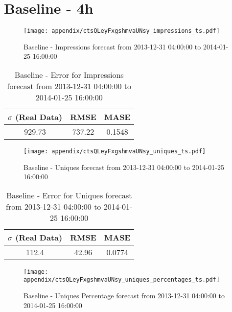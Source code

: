 \section{Baseline - 4h}
\begin{figure}[H] \begin{center} \leavevmode
\texttt{[image: appendix/ctsQLeyFxgshmvaUNsy\_impressions\_ts.pdf]} \caption[]{
Baseline - Impressions forecast from 2013-12-31 04:00:00 to 2014-01-25 16:00:00} \label{fig:appendix/ctsQLeyFxgshmvaUNsy_impressions_ts.pdf} \end{center}
\end{figure}

\begin{table}[H]
\centering
\footnotesize
\begin{tabular}{ccc}
$\sigma$ (Real Data) & RMSE & MASE   \\ \hline
929.73 & 737.22 & 0.1548 \\
\end{tabular}

\vspace{0.5cm}

\caption[]{
Baseline - Error for Impressions forecast from 2013-12-31 04:00:00 to 2014-01-25 16:00:00}
\end{table}

\begin{figure}[H] \begin{center} \leavevmode
\texttt{[image: appendix/ctsQLeyFxgshmvaUNsy\_uniques\_ts.pdf]} \caption[]{
Baseline - Uniques forecast from 2013-12-31 04:00:00 to 2014-01-25 16:00:00} \label{fig:appendix/ctsQLeyFxgshmvaUNsy_uniques_ts.pdf} \end{center}
\end{figure}

\begin{table}[H]
\centering
\footnotesize
\begin{tabular}{ccc}
$\sigma$ (Real Data) & RMSE & MASE   \\ \hline
112.4 & 42.96 & 0.0774 \\
\end{tabular}

\vspace{0.5cm}

\caption[]{
Baseline - Error for Uniques forecast from 2013-12-31 04:00:00 to 2014-01-25 16:00:00}
\end{table}

\begin{figure}[H] \begin{center} \leavevmode
\texttt{[image: appendix/ctsQLeyFxgshmvaUNsy\_uniques\_percentages\_ts.pdf]} \caption[]{
Baseline - Uniques Percentage forecast from 2013-12-31 04:00:00 to 2014-01-25 16:00:00} \label{fig:appendix/ctsQLeyFxgshmvaUNsy_uniques_percentages_ts.pdf} \end{center}
\end{figure}

